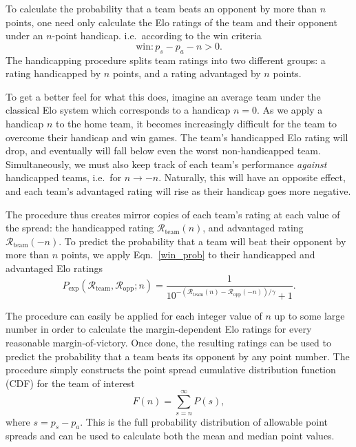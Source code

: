 \documentclass[aps,prc,reprint,amsmath,superscriptaddress]{revtex4-1}
\newcommand{\R}{\mathcal{R}}
\begin{document}
To calculate the probability that a team beats an opponent by more than $n$ points, one need only calculate the Elo ratings of the team and their opponent under an $n$-point handicap. i.e.\ according to the win criteria
\begin{equation}
  \text{win}: p_s - p_a - n > 0.
\end{equation}
The handicapping procedure splits team ratings into two different groups: a rating handicapped by $n$ points, and a rating advantaged by $n$ points.

To get a better feel for what this does, imagine an average team under the classical Elo system which corresponds to a handicap $n=0$. 
As we apply a handicap $n$ to the home team, it becomes increasingly difficult for the team to overcome their handicap and win games.
The team's handicapped Elo rating will drop, and eventually will fall below even the worst non-handicapped team.
Simultaneously, we must also keep track of each team's performance \emph{against} handicapped teams, i.e.\ for $n \rightarrow -n$.
Naturally, this will have an opposite effect, and each team's advantaged rating will rise as their handicap goes more negative.

The procedure thus creates mirror copies of each team's rating at each value of the spread: the handicapped rating $\R_\text{team}(n)$, and advantaged rating $\R_\text{team}(-n)$.
To predict the probability that a team will beat their opponent by more than $n$ points, we apply Eqn.~\eqref{win_prob} to their handicapped and advantaged Elo ratings
\begin{equation}
  \label{win_prob_hcap}
  P_\text{exp}(\R_\text{team}, \R_\text{opp}; n) = \frac{1}{10^{-(\R_\text{team}(n) - \R_\text{opp}(-n))/\gamma} + 1}.
\end{equation}

The procedure can easily be applied for each integer value of $n$ up to some large number in order to calculate the margin-dependent Elo ratings for every reasonable margin-of-victory.
Once done, the resulting ratings can be used to predict the probability that a team beats its opponent by any point number.
The procedure simply constructs the point spread cumulative distribution function (CDF) for the team of interest
\begin{equation}
  \label{cdf}
  F(n) = \sum_{s=n}^\infty P(s),
\end{equation}
where $s = p_s - p_a$.
This is the full probability distribution of allowable point spreads and can be used to calculate both the mean and median point values.
\end{document}
